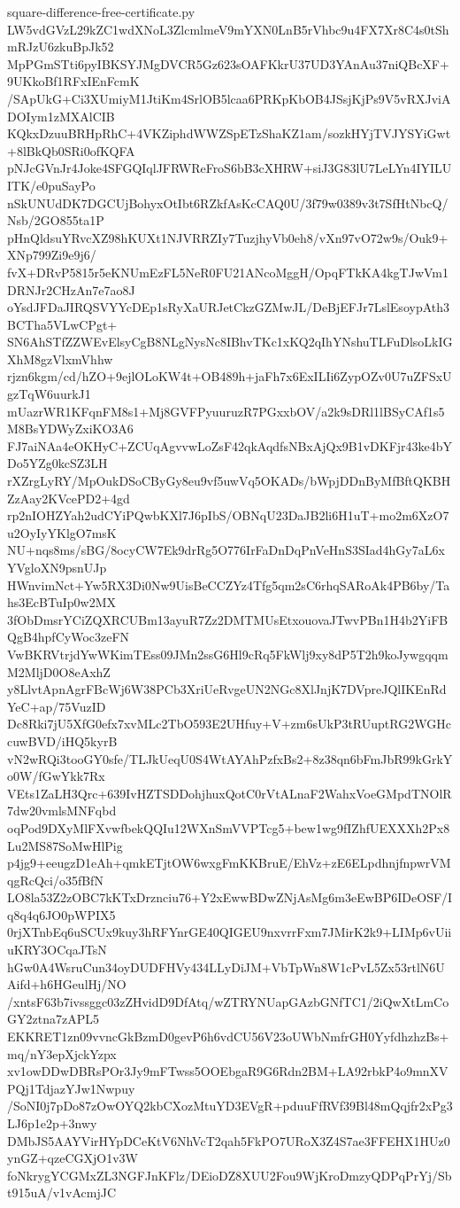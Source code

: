 \documentclass[11pt]{article}
\theoremstyle{definition}
\theoremstyle{remark}
\begin{document}
\begin{filecontents*}[overwrite]{square-difference-free-certificate.py}
LW5vdGVzL29kZC1wdXNoL3ZlcmlmeV9mYXN0LnB5rVhbc9u4FX7Xr8C4s0tShmRJzU6zkuBpJk52
MpPGmSTti6pyIBKSYJMgDVCR5Gz623sOAFKkrU37UD3YAnAu37niQBcXF+9UKkoBf1RFxIEnFcmK
/SApUkG+Ci3XUmiyM1JtiKm4SrlOB5lcaa6PRKpKbOB4JSsjKjPs9V5vRXJviADOIym1zMXAlCIB
KQkxDzuuBRHpRhC+4VKZiphdWWZSpETzShaKZ1am/sozkHYjTVJYSYiGwt+8lBkQb0SRi0ofKQFA
pNJcGVnJr4Joke4SFGQIqlJFRWReFroS6bB3cXHRW+siJ3G83lU7LeLYn4IYILUITK/e0puSayPo
nSkUNUdDK7DGCUjBohyxOtIbt6RZkfAsKcCAQ0U/3f79w0389v3t7SfHtNbcQ/Nsb/2GO855ta1P
pHnQldsuYRvcXZ98hKUXt1NJVRRZIy7TuzjhyVb0eh8/vXn97vO72w9s/Ouk9+XNp799Zi9e9j6/
fvX+DRvP5815r5eKNUmEzFL5NeR0FU21ANcoMggH/OpqFTkKA4kgTJwVm1DRNJr2CHzAn7e7ao8J
oYsdJFDaJIRQSVYYcDEp1sRyXaURJetCkzGZMwJL/DeBjEFJr7LslEsoypAth3BCTha5VLwCPgt+
SN6AhSTfZZWEvElsyCgB8NLgNysNc8IBhvTKc1xKQ2qIhYNshuTLFuDlsoLkIGXhM8gzVlxmVhhw
rjzn6kgm/cd/hZO+9ejlOLoKW4t+OB489h+jaFh7x6ExILIi6ZypOZv0U7uZFSxUgzTqW6uurkJ1
mUazrWR1KFqnFM8s1+Mj8GVFPyuuruzR7PGxxbOV/a2k9sDRl1lBSyCAf1s5M8BsYDWyZxiKO3A6
FJ7aiNAa4eOKHyC+ZCUqAgvvwLoZsF42qkAqdfsNBxAjQx9B1vDKFjr43ke4bYDo5YZg0kcSZ3LH
rXZrgLyRY/MpOukDSoCByGy8eu9vf5uwVq5OKADs/bWpjDDnByMfBftQKBHZzAay2KVcePD2+4gd
rp2nIOHZYah2udCYiPQwbKXl7J6pIbS/OBNqU23DaJB2li6H1uT+mo2m6XzO7u2OyIyYKlgO7msK
NU+nqs8ms/sBG/8ocyCW7Ek9drRg5O776IrFaDnDqPnVeHnS3SIad4hGy7aL6xYVgloXN9psnUJp
HWnvimNct+Yw5RX3Di0Nw9UisBeCCZYz4Tfg5qm2sC6rhqSARoAk4PB6by/Tahs3EcBTuIp0w2MX
3fObDmsrYCiZQXRCUBm13ayuR7Zz2DMTMUsEtxouovaJTwvPBn1H4b2YiFBQgB4hpfCyWoc3zeFN
VwBKRVtrjdYwWKimTEss09JMn2ssG6Hl9cRq5FkWlj9xy8dP5T2h9koJywgqqmM2MljD0O8eAxhZ
y8LlvtApnAgrFBcWj6W38PCb3XriUeRvgeUN2NGc8XlJnjK7DVpreJQlIKEnRdYeC+ap/75VuzID
Dc8Rki7jU5XfG0efx7xvMLc2TbO593E2UHfuy+V+zm6sUkP3tRUuptRG2WGHccuwBVD/iHQ5kyrB
vN2wRQi3tooGY0sfe/TLJkUeqU0S4WtAYAhPzfxBs2+8z38qn6bFmJbR99kGrkYo0W/fGwYkk7Rx
VEts1ZaLH3Qrc+639IvHZTSDDohjhuxQotC0rVtALnaF2WahxVoeGMpdTNOlR7dw20vmlsMNFqbd
oqPod9DXyMlFXvwfbekQQIu12WXnSmVVPTcg5+bew1wg9fIZhfUEXXXh2Px8Lu2MS87SoMwHlPig
p4jg9+eeugzD1eAh+qmkETjtOW6wxgFmKKBruE/EhVz+zE6ELpdhnjfnpwrVMqgRcQci/o35fBfN
LO8la53Z2zOBC7kKTxDrznciu76+Y2xEwwBDwZNjAsMg6m3eEwBP6IDeOSF/Iq8q4q6JO0pWPIX5
0rjXTnbEq6uSCUx9kuy3hRFYnrGE40QIGEU9nxvrrFxm7JMirK2k9+LIMp6vUiiuKRY3OCqaJTsN
hGw0A4WsruCun34oyDUDFHVy434LLyDiJM+VbTpWn8W1cPvL5Zx53rtlN6UAifd+h6HGeulHj/NO
/xntsF63b7ivssggc03zZHvidD9DfAtq/wZTRYNUapGAzbGNfTC1/2iQwXtLmCoGY2ztna7zAPL5
EKKRET1zn09vvncGkBzmD0gevP6h6vdCU56V23oUWbNmfrGH0YyfdhzhzBs+mq/nY3epXjckYzpx
xv1owDDwDBRsPOr3Jy9mFTwss5OOEbgaR9G6Rdn2BM+LA92rbkP4o9mnXVPQj1TdjazYJw1Nwpuy
/SoNI0j7pDo87zOwOYQ2kbCXozMtuYD3EVgR+pduuFfRVf39Bl48mQqjfr2xPg3LJ6p1e2p+3nwy
DMbJS5AAYVirHYpDCeKtV6NhVcT2qah5FkPO7URoX3Z4S7ae3FFEHX1HUz0ynGZ+qzeCGXjO1v3W
foNkrygYCGMxZL3NGFJnKFlz/DEioDZ8XUU2Fou9WjKroDmzyQDPqPrYj/Sbt915uA/v1vAcmjJC

\end{filecontents*}
\end{document}
